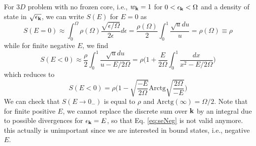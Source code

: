 \documentclass[11pt]{article} %
\begin{document}
For $3D$ problem with no frozen core, i.e., $w_{\mathbf{k}}=1$ for $0<\epsilon_{\mathbf{k}}<\Omega$ and a density of state in $\sqrt{\epsilon_{\mathbf{k}}}$, we can write $S(E)$ for $E=0$ as 
\begin{equation}
S(E=0)\approx\int_0^{\Omega}\rho(\Omega)\frac{\sqrt{\epsilon/\Omega}}{2\epsilon}d\epsilon
=\frac{\rho(\Omega)}{2}\int_0^1\frac{\sqrt{u}du}{u}=\rho(\Omega)\equiv\rho
\end{equation}
while for finite negative $E$, we find
\begin{equation}
S(E<0)\approx\frac{\rho}{2}\int_0^1\frac{\sqrt{u}du}{u-E/2\Omega}
=\rho\Big(1+\frac{E}{2\Omega}\int_0^1\frac{dx}{x^2-E/2\Omega}\Big)
\end{equation}
which reduces to 
\begin{equation}\label{eq:seNeg}
S(E<0)=\rho\Big(1-\sqrt{\frac{-E}{2\Omega}}\text{Arctg}\sqrt{\frac{2\Omega}{-E}}\Big)
\end{equation}
We can check that $S(E\to0_{-})$ is equal to $\rho$ and $\text{Arctg}(\infty)=\Omega/2$.  Note that for finite positive $E$, we cannot replace the discrete sum over $\mathbf{k}$ by an integral due to possible divergences for $\epsilon_{\mathbf{k}}=E$, so that Eq. \ref{eq:seNeg} is not valid anymore.  this actually is unimportant since we are interested in bound states, i.e., negative $E$.
\end{document}
